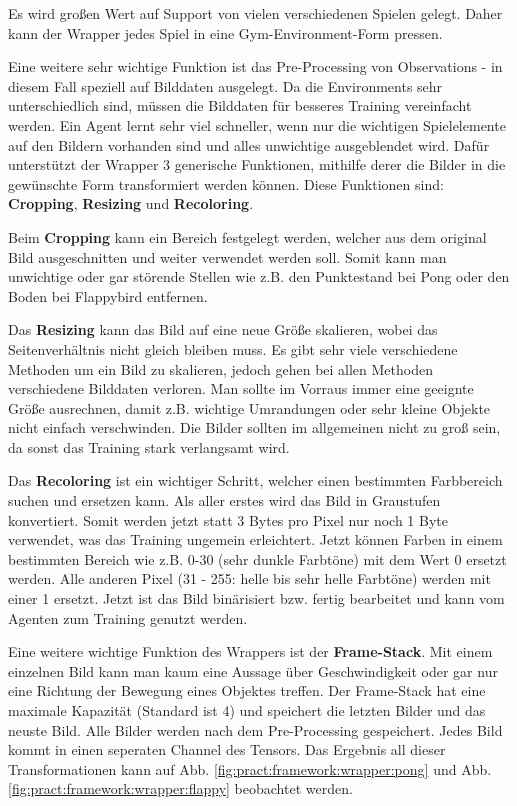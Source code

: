 \documentclass[12pt,a4paper]{article}
\begin{document}
Es wird großen Wert auf Support von vielen verschiedenen Spielen gelegt.
Daher kann der Wrapper jedes Spiel in eine Gym-Environment-Form pressen.

Eine weitere sehr wichtige Funktion ist das Pre-Processing von Observations - in diesem Fall speziell auf Bilddaten ausgelegt.
Da die Environments sehr unterschiedlich sind, müssen die Bilddaten für besseres Training vereinfacht werden.
Ein Agent lernt sehr viel schneller, wenn nur die wichtigen Spielelemente auf den Bildern vorhanden sind und alles unwichtige ausgeblendet wird.
Dafür unterstützt der Wrapper 3 generische Funktionen, mithilfe derer die Bilder in die gewünschte Form transformiert werden können.
Diese Funktionen sind: \textbf{Cropping}, \textbf{Resizing} und \textbf{Recoloring}.

Beim \textbf{Cropping} kann ein Bereich festgelegt werden, welcher aus dem original Bild ausgeschnitten und weiter verwendet werden soll.
Somit kann man unwichtige oder gar störende Stellen wie z.B. den Punktestand bei Pong oder den Boden bei Flappybird entfernen.

Das \textbf{Resizing} kann das Bild auf eine neue Größe skalieren, wobei das Seitenverhältnis nicht gleich bleiben muss.
Es gibt sehr viele verschiedene Methoden um ein Bild zu skalieren, jedoch gehen bei allen Methoden verschiedene Bilddaten verloren.
Man sollte im Vorraus immer eine geeignte Größe ausrechnen, damit z.B. wichtige Umrandungen oder sehr kleine Objekte nicht einfach verschwinden.
Die Bilder sollten im allgemeinen nicht zu groß sein, da sonst das Training stark verlangsamt wird.

Das \textbf{Recoloring} ist ein wichtiger Schritt, welcher einen bestimmten Farbbereich suchen und ersetzen kann.
Als aller erstes wird das Bild in Graustufen konvertiert.
Somit werden jetzt statt 3 Bytes pro Pixel nur noch 1 Byte verwendet, was das Training ungemein erleichtert.
Jetzt können Farben in einem bestimmten Bereich wie z.B. 0-30 (sehr dunkle Farbtöne) mit dem Wert 0 ersetzt werden.
Alle anderen Pixel (31 - 255: helle bis sehr helle Farbtöne) werden mit einer 1 ersetzt.
Jetzt ist das Bild binärisiert bzw. fertig bearbeitet und kann vom Agenten zum Training genutzt werden.

Eine weitere wichtige Funktion des Wrappers ist der \textbf{Frame-Stack}.
Mit einem einzelnen Bild kann man kaum eine Aussage über Geschwindigkeit oder gar nur eine Richtung der Bewegung eines Objektes treffen.
Der Frame-Stack hat eine maximale Kapazität (Standard ist 4) und speichert die letzten Bilder und das neuste Bild.
Alle Bilder werden nach dem Pre-Processing gespeichert.
Jedes Bild kommt in einen seperaten Channel des Tensors.
Das Ergebnis all dieser Transformationen kann auf Abb. \ref{fig:pract:framework:wrapper:pong} und Abb. \ref{fig:pract:framework:wrapper:flappy} beobachtet werden.
\end{document}
